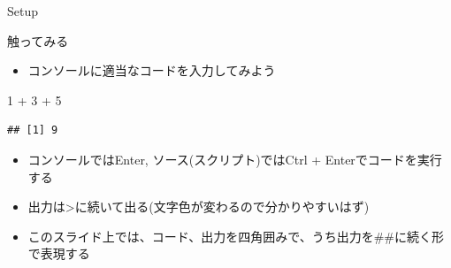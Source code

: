 \documentclass[
  ignorenonframetext,
]{beamer}
\newenvironment{Shaded}{\begin{snugshade}}{\end{snugshade}}
\newcommand{\DecValTok}[1]{\textcolor[rgb]{0.00,0.00,0.81}{#1}}
\newcommand{\SpecialCharTok}[1]{\textcolor[rgb]{0.00,0.00,0.00}{#1}}
\providecommand{\tightlist}{%
  \setlength{\itemsep}{0pt}\setlength{\parskip}{0pt}}
\begin{document}
\begin{frame}[fragile]{Setup}
\begin{block}{触ってみる}
\protect\hypertarget{ux89e6ux3063ux3066ux307fux308b}{}
\begin{itemize}
\tightlist
\item
  コンソールに適当なコードを入力してみよう
\end{itemize}

\begin{Shaded}
\begin{Highlighting}[]
\DecValTok{1} \SpecialCharTok{+} \DecValTok{3} \SpecialCharTok{+} \DecValTok{5}
\end{Highlighting}
\end{Shaded}

\begin{verbatim}
## [1] 9
\end{verbatim}

\begin{itemize}
\tightlist
\item
  コンソールではEnter, ソース(スクリプト)ではCtrl +
  Enterでコードを実行する
\item
  出力は\textgreater に続いて出る(文字色が変わるので分かりやすいはず)
\item
  このスライド上では、コード、出力を四角囲みで、うち出力を\#\#に続く形で表現する
\end{itemize}
\end{block}
\end{frame}
\end{document}
